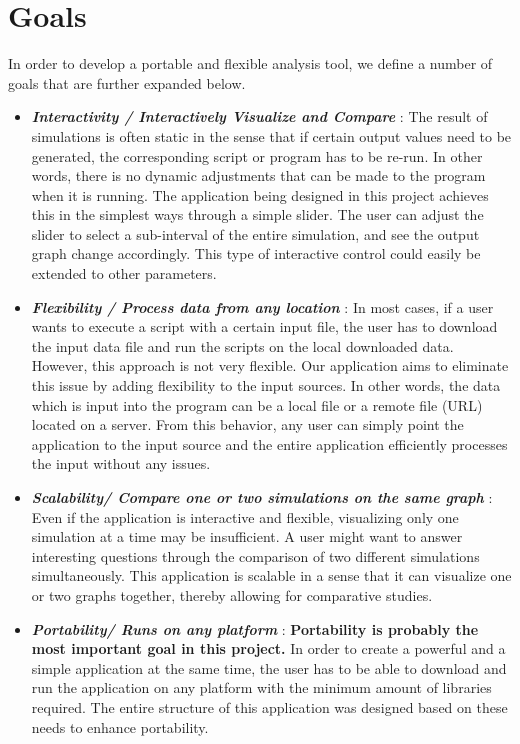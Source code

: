 \section*{Goals}

In order to develop a portable and flexible analysis tool, we define a number of goals that are further expanded below. 

\begin{itemize}
    \item \textbf{\textit{Interactivity / Interactively Visualize and Compare} }: The result of simulations is often static in the sense that if certain output values need to be generated, the corresponding script or program has to be re-run. In other words, there is no dynamic adjustments that can be made to the program when it is running. The application being designed in this project achieves this in the simplest ways through a simple slider. The user can adjust the slider to select a sub-interval of the entire simulation, and see the output graph change accordingly. This type of interactive control could easily be extended to other parameters.
    
    \item \textbf{\textit{Flexibility / Process data from any location} }: In most cases, if a user wants to execute a script with a certain input file, the user has to download the input data file and run the scripts on the local downloaded data. However, this approach is not very flexible. Our application aims to eliminate this issue by adding flexibility to the input sources. In other words, the data which is input into the program can be a local file or a remote file (URL) located on a server. From this behavior, any user can simply point the application to the input source and the entire application efficiently processes the input without any issues. 
    
    \item \textbf{\textit{Scalability/ Compare one or two simulations on the same graph} }: Even if the application is interactive and flexible, visualizing only one simulation at a time may be insufficient. A user might want to answer interesting questions through the comparison of two different simulations simultaneously. This application is scalable in a sense that it can visualize one or two graphs together, thereby allowing for comparative studies. 
    
    \item \textbf{\textit{Portability/ Runs on any platform} }: \textbf{Portability is probably the most important goal in this project.} In order to create a powerful and a simple application at the same time, the user has to be able to download and run the application on any platform with the minimum amount of libraries required. The entire structure of this application was designed based on these needs to enhance portability.   
\end{itemize}